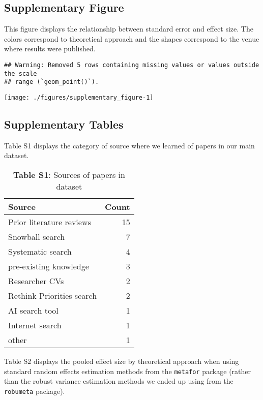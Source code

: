 \documentclass[sn-nature,pdflatex]{sn-jnl}
\begin{document}
\subsection{Supplementary Figure}\label{supplementary-figure}

This figure displays the relationship between standard error and effect
size. The colors correspond to theoretical approach and the shapes
correspond to the venue where results were published.

\begin{verbatim}
## Warning: Removed 5 rows containing missing values or values outside the scale
## range (`geom_point()`).
\end{verbatim}

\texttt{[image: ./figures/supplementary\_figure-1]}

\subsection{Supplementary Tables}\label{supplementary-tables}

Table S1 displays the category of source where we learned of papers in
our main dataset. \captionsetup[table]{labelformat=empty}

\begin{table}[!h]
\centering
\caption{\label{tab:supp_table_one}\textbf{Table S1}: Sources of papers in dataset}
\centering
\begin{tabular}[t]{lr}
\toprule
Source & Count\\
\midrule
Prior literature reviews & 15\\
Snowball search & 7\\
Systematic search & 4\\
pre-existing knowledge & 3\\
Researcher CVs & 2\\
\addlinespace
Rethink Priorities search & 2\\
AI search tool & 1\\
Internet search & 1\\
other & 1\\
\bottomrule
\end{tabular}
\end{table}

Table S2 displays the pooled effect size by theoretical approach when
using standard random effects estimation methods from the
\texttt{metafor} package (rather than the robust variance estimation
methods we ended up using from the \texttt{robumeta} package).
\end{document}
